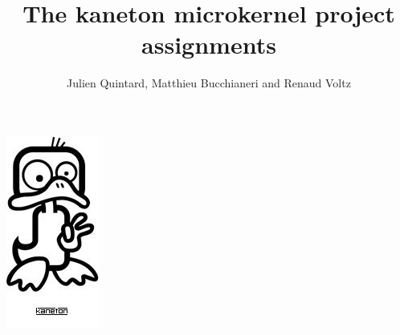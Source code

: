 
%
%



%
%


%
%

\title{The kaneton microkernel project assignments}

%
%

\author{\small{Julien Quintard},
        \small{Matthieu Bucchianeri} and
        \small{Renaud Voltz}}

%
%

\newcommand\prototype[1]{\hspace{1.5cm}#1}

%
%



%
%

\maketitle

\begin{center}
  \includegraphics[scale=0.8]{../../logos/kaneton.jpg}
\end{center}

\newpage

\tableofcontents

\newpage

%
%

